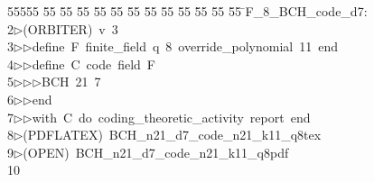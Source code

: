 %
%
\begin{tabbing}
55555 \= 55 \= 55 \= 55 \= 55 \= 55 \= 55 \= 55 \= 55 \= 55 \= 55 \= 55 \= 55 \= \>F\_8\_BCH\_code\_d7:\\[0pt]
2\>$\triangleright$\>(ORBITER)\ v\ 3\ \\[0pt]
3\>$\triangleright$\>$\triangleright$\>define\ F\ finite\_field\ q\ 8\ override\_polynomial\ 11\ end\ \\[0pt]
4\>$\triangleright$\>$\triangleright$\>define\ C\ code\ field\ F\ \\[0pt]
5\>$\triangleright$\>$\triangleright$\>$\triangleright$\>BCH\ 21\ 7\ \\[0pt]
6\>$\triangleright$\>$\triangleright$\>end\ \\[0pt]
7\>$\triangleright$\>$\triangleright$\>with\ C\ do\ coding\_theoretic\_activity\ report\ end\\[0pt]
8\>$\triangleright$\>(PDFLATEX)\ BCH\_n21\_d7\_code\_n21\_k11\_q8tex\\[0pt]
9\>$\triangleright$\>(OPEN)\ BCH\_n21\_d7\_code\_n21\_k11\_q8pdf\\[0pt]
10\>\end{tabbing}
